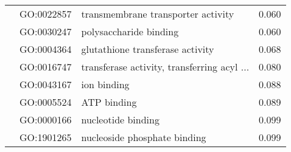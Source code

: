 \begin{longtable}{lllr}
   & GO:0022857 &           transmembrane transporter activity &         0.060 \\
   & GO:0030247 &                       polysaccharide binding &         0.060 \\
   & GO:0004364 &             glutathione transferase activity &         0.068 \\
   & GO:0016747 &  transferase activity, transferring acyl ... &         0.080 \\
   & GO:0043167 &                                  ion binding &         0.088 \\
   & GO:0005524 &                                  ATP binding &         0.089 \\
   & GO:0000166 &                           nucleotide binding &         0.099 \\
   & GO:1901265 &                 nucleoside phosphate binding &         0.099 \\
\end{longtable}
